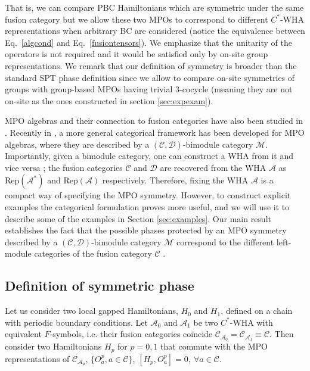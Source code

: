 \documentclass[a4paper,twocolumn,11pt,accepted=2023-02-10]{quantumarticle}
\begin{document}
That is, we can compare PBC Hamiltonians which are symmetric under the same fusion category but we allow these two MPOs to correspond to different $C^*$-WHA representations when arbitrary BC are considered (notice the equivalence between Eq.\ \eqref{algcond} and Eq.\ \eqref{fusiontensors}). We emphasize that the unitarity of the operators is not required and it would be satisfied only by on-site group representations. We remark that our definition of symmetry is broader than the standard SPT phase definition since we allow to compare on-site symmetries of groups with group-based MPOs having trivial $3$-cocycle (meaning they are not on-site as the ones constructed in section \ref{sec:expexam}).

MPO algebras and their connection to fusion categories have also been studied in \cite{Bultinck17A}. Recently in \cite{Lootens21A}, a more general categorical framework has been developed for MPO algebras, where they are described by a $(\mathcal{C},\mathcal{D})$-bimodule category $\mathcal{M}$. Importantly, given a bimodule category, one can construct a WHA from it and vice versa \cite{ostrik2001module,EGNObook,Bohm96}; the fusion categories $\mathcal{C}$ and $\mathcal{D}$ are recovered from the WHA $\mathcal{A}$ as $\text{Rep}(\mathcal{A}^*)$ and $\text{Rep}(\mathcal{A})$ respectively. Therefore, fixing the WHA $\mathcal{A}$ is a compact way of specifying the MPO symmetry. However, to construct explicit examples  the categorical formulation proves more useful, and we will use it to describe some of the examples in Section \ref{sec:examples}. Our main result establishes the fact that the possible phases protected by an MPO symmetry described by a $(\mathcal{C},\mathcal{D})$-bimodule category $\mathcal{M}$ correspond to the different left-module categories of the fusion category $\mathcal{C}$ \cite{etingof2003finite}. 

\subsection{Definition of symmetric phase}

Let us consider two local gapped Hamiltonians, $H_0$ and $H_1$, defined on a chain with periodic boundary conditions. Let $\mathcal{A}_0$ and $\mathcal{A}_1$ be two $C^*$-WHA with equivalent $F$-symbols, i.e. their fusion categories coincide $\mathcal{C}_{\mathcal{A}_0} =  \mathcal{C}_{\mathcal{A}_1} \equiv \mathcal{C}$. 
Then consider two Hamiltonians $H_p$ for $p=0,1$ that commute with the MPO representations of $\mathcal{C}_{\mathcal{A}_p}$, $\{O^p_a, a\in \mathcal{C} \}$, $[H_p,O^p_a]=0,\ \forall a\in \mathcal{C}$.
\end{document}

